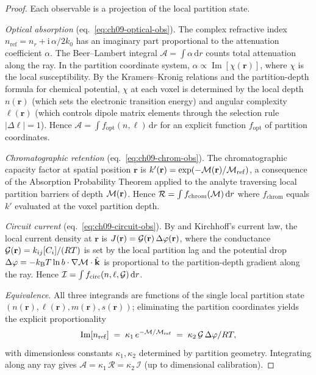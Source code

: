 \begin{proof}
Each observable is a projection of the local partition state.

\emph{Optical absorption} (eq.~\eqref{eq:ch09-optical-obs}).  The complex
refractive index $n_{\mathrm{ref}} = n_r + \mathrm{i}\,\alpha/2k_0$ has an
imaginary part proportional to the attenuation coefficient $\alpha$.  The
Beer--Lambert integral $\mathcal{A} = \int\alpha\,\mathrm{d}r$ counts total
attenuation along the ray.  In the partition coordinate system, $\alpha
\propto \operatorname{Im}[\chi(\mathbf{r})]$, where $\chi$ is the local
susceptibility.  By the Kramers--Kronig relations and the partition-depth
formula for chemical potential, $\chi$ at each voxel is determined by the
local depth $n(\mathbf{r})$ (which sets the electronic transition energy) and
angular complexity $\ell(\mathbf{r})$ (which controls dipole matrix elements
through the selection rule $|\Delta\ell| = 1$).  Hence
$\mathcal{A} = \int f_{\mathrm{opt}}(n,\ell)\,\mathrm{d}r$ for an explicit
function $f_{\mathrm{opt}}$ of partition coordinates.

\emph{Chromatographic retention} (eq.~\eqref{eq:ch09-chrom-obs}).  The
chromatographic capacity factor at spatial position $\mathbf{r}$ is
$k'(\mathbf{r}) = \exp(-\mathcal{M}(\mathbf{r})/\mathcal{M}_{\mathrm{ref}})$, a
consequence of the Absorption Probability Theorem applied to the analyte
traversing local partition barriers of depth $\mathcal{M}(\mathbf{r})$.  Hence
$\mathcal{R} = \int f_{\mathrm{chrom}}(\mathcal{M})\,\mathrm{d}r$ where
$f_{\mathrm{chrom}}$ equals $k'$ evaluated at the voxel partition depth.

\emph{Circuit current} (eq.~\eqref{eq:ch09-circuit-obs}).  By
 and Kirchhoff's current law, the local current
density at $\mathbf{r}$ is $J(\mathbf{r}) = \mathcal{G}(\mathbf{r})\,
\Delta\varphi(\mathbf{r})$, where the conductance $\mathcal{G}(\mathbf{r}) =
k_{ij}[C_i]/(RT)$ is set by the local partition lag and the
potential drop $\Delta\varphi = -k_{\mathrm{B}} T\ln b\cdot
\nabla\mathcal{M}\cdot\hat{\mathbf{k}}$ is proportional to the partition-depth
gradient along the ray.  Hence $\mathcal{I} = \int f_{\mathrm{circ}}(n,
\ell, \mathcal{G})\,\mathrm{d}r$.

\emph{Equivalence}.  All three integrands are functions of the single local
partition state $(n(\mathbf{r}), \ell(\mathbf{r}), m(\mathbf{r}),
s(\mathbf{r}))$; eliminating the partition coordinates yields the explicit
proportionality
\begin{equation}
  \operatorname{Im}[n_{\mathrm{ref}}]
  \;=\; \kappa_1\,e^{-\mathcal{M}/\mathcal{M}_{\mathrm{ref}}}
  \;=\; \kappa_2\,\mathcal{G}\,\Delta\varphi/RT,
  \label{eq:ch09-triple-identity}
\end{equation}
with dimensionless constants $\kappa_1, \kappa_2$ determined by partition
geometry.  Integrating along any ray gives
$\mathcal{A} = \kappa_1\,\mathcal{R} = \kappa_2\,\mathcal{I}$ (up to
dimensional calibration).
\end{proof}


